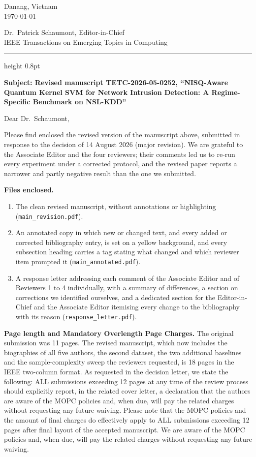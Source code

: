 \documentclass[11pt,a4paper]{article}
\begin{document}
\begin{flushright}
Danang, Vietnam\\
\today
\end{flushright}

Dr.\ Patrick Schaumont, Editor-in-Chief\\
IEEE Transactions on Emerging Topics in Computing

\vspace{6pt}
{\color{rulegray}\hrule height 0.8pt}
\vspace{8pt}

\textbf{Subject: Revised manuscript TETC-2026-05-0252, ``NISQ-Aware Quantum
Kernel SVM for Network Intrusion Detection: A Regime-Specific Benchmark on
NSL-KDD''}

Dear Dr.\ Schaumont,

Please find enclosed the revised version of the manuscript above, submitted in
response to the decision of 14 August 2026 (major revision). We are grateful to
the Associate Editor and the four reviewers; their comments led us to re-run
every experiment under a corrected protocol, and the revised paper reports a
narrower and partly negative result than the one we submitted.

\textbf{Files enclosed.}
\begin{enumerate}[leftmargin=1.6em,itemsep=2pt]
  \item The clean revised manuscript, without annotations or highlighting
    (\texttt{main\_revision.pdf}).
  \item An annotated copy in which new or changed text, and every added or
    corrected bibliography entry, is set on a yellow background, and every
    subsection heading carries a tag stating what changed and which reviewer
    item prompted it (\texttt{main\_annotated.pdf}).
  \item A response letter addressing each comment of the Associate Editor and
    of Reviewers 1 to 4 individually, with a summary of differences, a section
    on corrections we identified ourselves, and a dedicated section for the
    Editor-in-Chief and the Associate Editor itemising every change to the
    bibliography with its reason (\texttt{response\_letter.pdf}).
\end{enumerate}

\textbf{Page length and Mandatory Overlength Page Charges.} The original
submission was 11 pages. The revised manuscript, which now includes the
biographies of all five authors, the second dataset, the two additional
baselines and the sample-complexity sweep the reviewers requested, is 18 pages
in the IEEE two-column format. As requested in the decision letter, we state
the following: ALL submissions exceeding 12 pages at any time of the review
process should explicitly report, in the related cover letter, a declaration
that the authors are aware of the MOPC policies and, when due, will pay the
related charges without requesting any future waiving. Please note that the
MOPC policies and the amount of final charges do effectively apply to ALL
submissions exceeding 12 pages after final layout of the accepted manuscript.
We are aware of the MOPC policies and, when due, will pay the related charges
without requesting any future waiving.
\end{document}
